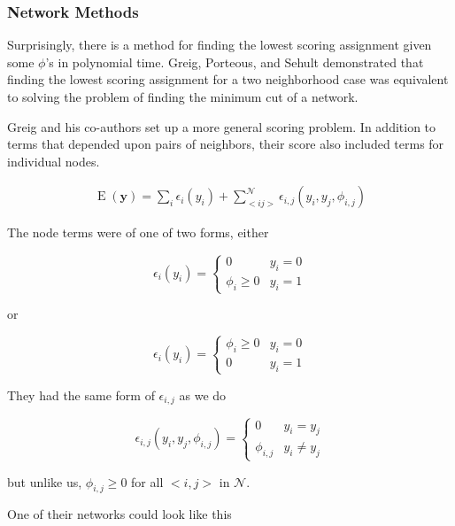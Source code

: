 \subsubsection{Network Methods}
Surprisingly, there is a method for finding the lowest scoring
assignment given some $\phi$'s in polynomial time. Greig, Porteous,
and Sehult demonstrated that finding the lowest scoring assignment for
a two neighborhood case was equivalent to solving the problem of
finding the minimum cut of a network.\cite{greig_exact_1989}

Greig and his co-authors set up a more general scoring problem. In
addition to terms that depended upon pairs of neighbors, their score
also included terms for individual nodes.

\begin{align}
\operatorname{E}(\mathbf{y}) = \sum_i\epsilon_i(y_i) + \sum_{<i
  j>}^{\mathcal{N}}\epsilon_{i,j}(y_i,y_j,\phi_{i,j})
\end{align}

\noindent
The node terms were of one of two forms, either

\begin{equation}
\epsilon_{i}(y_i) = \begin{cases}
  0 &y_i = 0 \\
  \phi_{i} \geq 0 &y_i = 1
\end{cases}
\end{equation}

\noindent
or 

\begin{equation}
\epsilon_{i}(y_i) = \begin{cases}
  \phi_{i} \geq 0 &y_i = 0 \\
  0 &y_i = 1
\end{cases}
\end{equation}

\noindent
They had the same form of $\epsilon_{i,j}$ as we do

\begin{equation}
\epsilon_{i,j}(y_i,y_j,\phi_{i,j}) = \begin{cases}
  0 &y_i = y_j \\
  \phi_{i,j} &y_i \neq y_j
\end{cases}
\end{equation}

\noindent
but unlike us, $\phi_{i,j} \geq 0$ for all $<i, j>$ in $\mathcal{N}$. 

One of their networks could look like this

